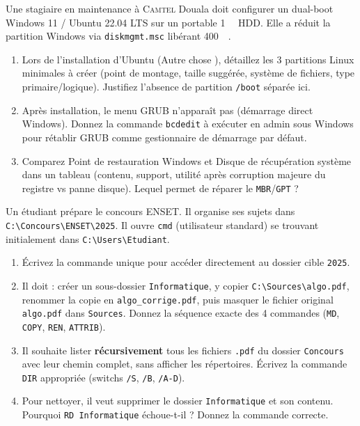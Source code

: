 \documentclass[11pt]{article}
\begin{document}
\begin{exercice}
\label{exo:dualboot}
Une stagiaire en maintenance à \textsc{Camtel} Douala doit configurer un dual-boot Windows 11 / Ubuntu 22.04 LTS sur un portable \SI{1}{\tera\byte} HDD. Elle a réduit la partition Windows via \texttt{diskmgmt.msc} libérant \SI{400}{\giga\byte}.
\begin{enumerate}
    \item [2 pts] Lors de l'installation d'Ubuntu (\og Autre chose \fg{}), détaillez les 3 partitions Linux minimales à créer (point de montage, taille suggérée, système de fichiers, type primaire/logique). Justifiez l'absence de partition \texttt{/boot} séparée ici.
    \item [1 pt] Après installation, le menu GRUB n'apparaît pas (démarrage direct Windows). Donnez la commande \texttt{bcdedit} à exécuter en admin sous Windows pour rétablir GRUB comme gestionnaire de démarrage par défaut.
    \item [2 pts] Comparez \og Point de restauration Windows \fg{} et \og Disque de récupération système \fg{} dans un tableau (contenu, support, utilité après corruption majeure du registre vs panne disque). Lequel permet de réparer le \texttt{MBR}/\texttt{GPT} ?
\end{enumerate}
\end{exercice}

\begin{exercice}
\label{exo:cmd_files}
Un étudiant prépare le concours ENSET. Il organise ses sujets dans \texttt{C:\textbackslash{}Concours\textbackslash{}ENSET\textbackslash{}2025}. Il ouvre \texttt{cmd} (utilisateur standard) se trouvant initialement dans \texttt{C:\textbackslash{}Users\textbackslash{}Etudiant}.
\begin{enumerate}
    \item [1 pt] Écrivez la commande unique pour accéder directement au dossier cible \texttt{2025}.
    \item [2 pts] Il doit : créer un sous-dossier \texttt{Informatique}, y copier \texttt{C:\textbackslash{}Sources\textbackslash{}algo.pdf}, renommer la copie en \texttt{algo\_corrige.pdf}, puis masquer le fichier original \texttt{algo.pdf} dans \texttt{Sources}. Donnez la séquence exacte des 4 commandes (\texttt{MD}, \texttt{COPY}, \texttt{REN}, \texttt{ATTRIB}).
    \item [1 pt] Il souhaite lister \textbf{récursivement} tous les fichiers \texttt{.pdf} du dossier \texttt{Concours} avec leur chemin complet, sans afficher les répertoires. Écrivez la commande \texttt{DIR} appropriée (switchs \texttt{/S}, \texttt{/B}, \texttt{/A-D}).
    \item [1 pt] Pour nettoyer, il veut supprimer le dossier \texttt{Informatique} et son contenu. Pourquoi \texttt{RD Informatique} échoue-t-il ? Donnez la commande correcte.
\end{enumerate}
\end{exercice}
\end{document}
